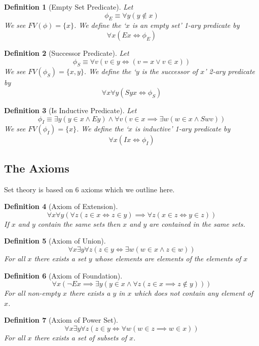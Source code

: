 \documentclass[12pt]{article}
\theoremstyle{break}
\newtheorem{definition}{Definition}[section]
\theoremstyle{break}
\theoremstyle{break}
\theoremstyle{break}
\theoremstyle{break}
\newtheorem{informal definition}[definition]{Informal Definition}
\begin{document}
\begin{definition}[Empty Set Predicate]
Let
$$
\phi_E \equiv \forall y (y\not\in x)
$$
We see $FV(\phi) = \{x\}$.
We define the `$x$ is an empty set' 1-ary predicate by
$$
\forall x (Ex \iff \phi_E)
$$
\end{definition}

\begin{definition}[Successor Predicate]
Let
$$
\phi_S \equiv \forall v (v\in y \iff (v = x \lor v\in x))
$$
We see $FV(\phi_S) = \{x, y\}$.
We define the `$y$ is the successor of $x$' 2-ary predicate by
$$
\forall x \forall y (Syx \iff \phi_S)
$$
\end{definition}

\begin{definition}[Is Inductive Predicate]
Let
$$
\phi_I \equiv \exists y (y\in x \land Ey) \land \forall v(v\in x \implies \exists w (w\in x \land Swv))
$$
We see $FV(\phi_I) = \{x\}$.
We define the `$x$ is inductive' 1-ary predicate by
$$
\forall x (Ix \iff \phi_I)
$$
\end{definition}

\subsection{The Axioms}

Set theory is based on 6 axioms which we outline here.

\begin{definition}[Axiom of Extension]
$$
\forall x \forall y (\forall z (z\in x \iff z\in y) \implies \forall z(x\in z \iff y \in z))
$$
If $x$ and $y$ contain the same sets then $x$ and $y$ are contained in the same sets.
\end{definition}

\begin{definition}[Axiom of Union]
$$
\forall x\exists y\forall z(z\in y \iff \exists w (w\in x \land z\in w))
$$
For all $x$ there exists a set $y$ whose elements are elements of the elements of $x$
\end{definition}

\begin{definition}[Axiom of Foundation]
$$
\forall x (\lnot Ex \implies \exists y(y\in x \land \forall z (z\in x \implies z\not \in y)))
$$
For all non-empty $x$ there exists a $y$ in $x$ which does not contain any element of $x$.
\end{definition}

\begin{definition}[Axiom of Power Set]
$$
\forall x \exists y \forall z (z\in y \iff \forall w(w\in z \implies w \in x))
$$
For all $x$ there exists a set of subsets of $x$.
\end{definition}
\end{document}
